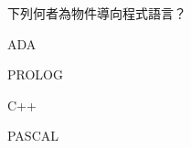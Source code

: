 \ifx\ntpcNinetyThree\undefined[93學年基北區] \fi
下列何者為物件導向程式語言？
  \begin{optionlist}
  \item ADA
  \item PROLOG
  \item C++\label{ntpc-93-a20}
  \item PASCAL
  \end{optionlist}